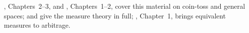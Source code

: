 
\furtherreading
\textcite{shreve1}, Chapters~2--3, and \textcite{shreve2}, Chapters~1--2, cover this material
on coin-toss and general spaces; \textcite{williams} and \textcite{durrett} give the measure
theory in full; \textcite{follmer-schied}, Chapter~1, brings equivalent measures to arbitrage.
